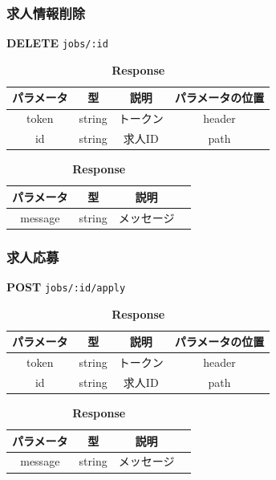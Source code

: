\subsubsection*{求人情報削除}
\textbf{DELETE} \texttt{jobs/:id}
\begin{table}[H]
  \begin{minipage}
    {0.5\hsize} \centering \captionsetup{labelformat=empty,labelsep=none} \caption{\textbf{Request}}
    \begin{tabular}{|c|c|c|c|} \hline
      パラメータ & 型      & 説明   & パラメータの位置 \\ \hline \hline
      token & string & トークン & header   \\ \hline
      id    & string & 求人ID & path     \\ \hline
    \end{tabular}
  \end{minipage}
  \begin{minipage}
    {0.5\hsize} \centering \captionsetup{labelformat=empty,labelsep=none} \caption{\textbf{Response}}
    \begin{tabular}{|c|c|c|c|} \hline
      パラメータ   & 型      & 説明    \\ \hline \hline
      message & string & メッセージ \\ \hline
    \end{tabular}
  \end{minipage}
\end{table}

\subsubsection*{求人応募}
\textbf{POST} \texttt{jobs/:id/apply}
\begin{table}[H]
  \begin{minipage}
    {0.5\hsize} \centering \captionsetup{labelformat=empty,labelsep=none} \caption{\textbf{Request}}
    \begin{tabular}{|c|c|c|c|} \hline
      パラメータ & 型      & 説明   & パラメータの位置 \\ \hline \hline
      token & string & トークン & header   \\ \hline
      id    & string & 求人ID & path     \\ \hline
    \end{tabular}
  \end{minipage}
  \begin{minipage}
    {0.5\hsize} \centering \captionsetup{labelformat=empty,labelsep=none} \caption{\textbf{Response}}
    \begin{tabular}{|c|c|c|c|} \hline
      パラメータ   & 型      & 説明    \\ \hline \hline
      message & string & メッセージ \\ \hline
    \end{tabular}
  \end{minipage}
\end{table}
\hrulefill
